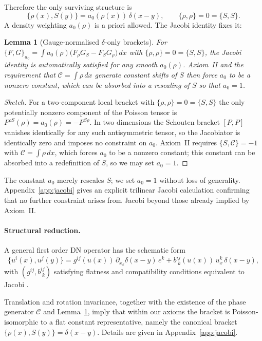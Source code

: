 \documentclass[11pt,a4paper]{article}
\numberwithin{equation}{section}
\theoremstyle{thmcompact}
\newtheorem{lemma}[theorem]{Lemma}
\theoremstyle{remark}
\begin{document}
Therefore the only surviving structure is
\[
\{\rho(x),S(y)\}=a_{0}(\rho(x))\,\delta(x-y),\qquad \{\rho,\rho\}=0=\{S,S\}.
\]
A density weighting $a_{0}(\rho)$ is a priori allowed. The Jacobi identity fixes it:

\begin{lemma}[Gauge-normalised $\delta$-only brackets]\label{lem:jacobi-a0}
	For
	\(
	\{F,G\}_{a_{0}}=\int a_{0}(\rho)\big(F_{\rho}G_{S}-F_{S}G_{\rho}\big)\,dx
	\)
	with $\{\rho,\rho\}=0=\{S,S\}$, the Jacobi identity is automatically satisfied for any smooth $a_{0}(\rho)$. Axiom~II and the requirement that $\mathcal C=\!\int\rho\,dx$ generate constant shifts of $S$ then force $a_{0}$ to be a nonzero constant, which can be absorbed into a rescaling of $S$ so that $a_{0}=1$.
\end{lemma}

\begin{proof}[Sketch]
	For a two-component local bracket with $\{\rho,\rho\}=0=\{S,S\}$ the only potentially nonzero component of the Poisson tensor is $P^{\rho S}(\rho)=a_{0}(\rho)=-P^{S\rho}$. In two dimensions the Schouten bracket $[P,P]$ vanishes identically for any such antisymmetric tensor, so the Jacobiator is identically zero and imposes no constraint on $a_{0}$. Axiom~II requires $\{S,\mathcal C\}=-1$ with $\mathcal C=\!\int\rho\,dx$, which forces $a_{0}$ to be a nonzero constant; this constant can be absorbed into a redefinition of $S$, so we may set $a_{0}=1$.
\end{proof}

The constant $a_0$ merely rescales $S$; we set $a_0=1$ without loss of generality.
Appendix~\ref{app:jacobi}
gives an explicit trilinear Jacobi calculation confirming that no further constraint arises from Jacobi beyond those already implied by Axiom~II.

\paragraph{Structural reduction.}
A general first order DN operator has the schematic form
\[
\{u^{i}(x),u^{j}(y)\}
=g^{ij}(u(x))\,\partial_{x_k}\delta(x-y)\,e^{k}
+b^{ij}_{\;k}(u(x))\,u^{k}_{x}\,\delta(x-y),
\]
with $(g^{ij},b^{ij}_{\;k})$ satisfying flatness and compatibility conditions equivalent to Jacobi \cite{Dubrovin1983,novikov1984}.

Translation and rotation invariance, together with the existence of the phase generator $\mathcal C$ and Lemma~\ref{lem:jacobi-a0}, imply that within our axioms the bracket is Poisson-isomorphic to a flat constant representative, namely the canonical bracket
\(
\{\rho(x),S(y)\}=\delta(x-y)
\).
Details are given in Appendix~\ref{app:jacobi}.
\end{document}
